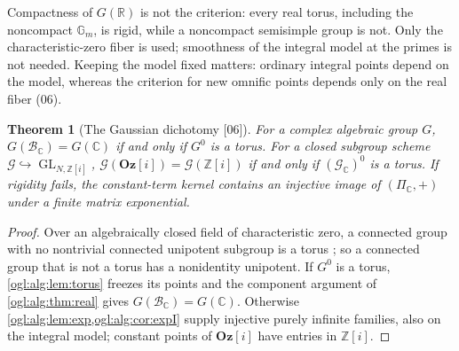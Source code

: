 \documentclass[11pt,oneside]{article}
\numberwithin{equation}{section}
\newtheorem{theorem}{Theorem}[section]
\theoremstyle{definition}
\theoremstyle{remark}
\newcommand{\GOz}{\mathbf{Oz}[i]}
\newcommand{\Z}{\mathbb Z}
\newcommand{\R}{\mathbb R}
\newcommand{\C}{\mathbb C}
\newcommand{\BC}{\mathcal B_{\C}}
\newcommand{\cG}{\mathcal G}
\newcommand{\Gm}{\mathbb G_m}
\newcommand{\GL}{\operatorname{GL}}
\newcommand{\src}[1]{\textup{\textsf{\small[#1]}}}
\begin{document}
Compactness of $G(\R)$ is not the criterion: every real torus, including the
noncompact $\Gm$, is rigid, while a noncompact semisimple group is not. Only the
characteristic-zero fiber is used; smoothness of the integral model at the
primes is not needed. Keeping the model fixed matters: ordinary integral points
depend on the model, whereas the criterion for new omnific points depends only
on the real fiber (06).

\begin{theorem}[The Gaussian dichotomy \src{06}]\label{ogl:alg:thm:complex}
For a complex algebraic group $G$, $G(\BC)=G(\C)$ if and only if $G^0$ is a
torus. For a closed subgroup scheme $\cG\hookrightarrow\GL_{N,\Z[i]}$,
$\cG(\GOz)=\cG(\Z[i])$ if and only if $(\cG_\C)^0$ is a torus. If rigidity fails,
the constant-term kernel contains an injective image of $(\Pi_\C,+)$ under a
finite matrix exponential.
\end{theorem}
\begin{proof}
Over an algebraically closed field of characteristic zero, a connected group
with no nontrivial connected unipotent subgroup is a torus
\cite[Corollary~17.25]{MilneAG}; so a connected group that is not a torus has
a nonidentity unipotent. If $G^0$ is a torus, \cref{ogl:alg:lem:torus}
freezes its points and the component argument of \cref{ogl:alg:thm:real}
gives $G(\BC)=G(\C)$. Otherwise \cref{ogl:alg:lem:exp,ogl:alg:cor:expI}
supply injective purely infinite families, also on the integral model;
constant points of $\GOz$ have entries in $\Z[i]$.
\end{proof}
\end{document}
